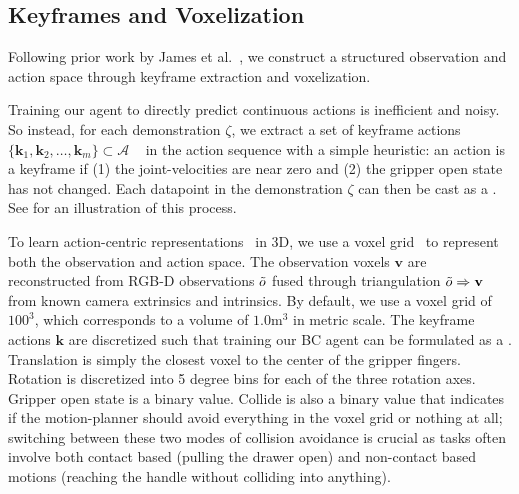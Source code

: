 \subsection{Keyframes and Voxelization}
\label{sec:keyframe_and_voxel}
\vspace{-0.2cm}

Following prior work by James et al.~\citep{c2farm}, we construct a  structured observation and action space through keyframe extraction and voxelization.

Training our agent to directly predict continuous actions is inefficient and noisy. So instead, for each demonstration $\zeta$, we extract a set of keyframe actions $\{\mathbf{k}_{1}, \mathbf{k}_{2}, \ldots, \mathbf{k}_{m}\} \subset \mathcal{A}$ ~\citep{johns2021coarse} in the action sequence with a simple heuristic: an action is a keyframe if (1) the joint-velocities are near zero and (2) the gripper open state has not changed. 
Each datapoint in the demonstration $\zeta$ can then be cast as a . See  for an illustration of this process. 

To learn action-centric representations~\cite{gibson2014ecological} in 3D, we use a voxel grid~\citep{moravec1996robot,30724} to represent both the observation and action space. The observation voxels $\mathbf{v}$ are reconstructed from RGB-D observations $\Tilde{o}$ fused through triangulation $\Tilde{o} \Rightarrow \mathbf{v}$ from known camera extrinsics and intrinsics. By default, we use a voxel grid of $100^3$, which corresponds to a volume of $1.0\textrm{m}^3$ in metric scale. The keyframe actions $\mathbf{k}$ are discretized such that training our BC agent can be formulated as a .
Translation is simply the closest voxel to the center of the gripper fingers. Rotation is discretized into 5 degree bins for each of the three rotation axes. Gripper open state is a binary value. Collide is also a binary value that indicates if the motion-planner should avoid everything in the voxel grid or nothing at all; switching between these two modes of collision avoidance is crucial as tasks often involve both contact based (\eg pulling the drawer open) and non-contact based motions (\eg reaching the handle without colliding into anything). 
\vspace{-0.2cm}

